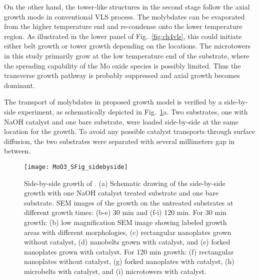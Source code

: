 On the other hand, the tower-like structures in the second stage follow the axial growth mode in conventional VLS process. The molybdates can be evaporated from the higher temperature end and re-condense onto the lower temperature region. As illustrated in the lower panel of Fig.~\ref{fig:ch4vls}, this could initiate either belt growth or tower growth depending on the locations. The microtowers in this study primarily grow at the low temperature end of the substrate, where the spreading capability of the Mo oxide species is possibly limited. Thus the transverse growth pathway is probably suppressed and axial growth becomes dominant.

The transport of molybdates in proposed growth model is verified by a side-by-side experiment, as schematically depicted in Fig.~\ref{fig:ch4sbs}a. Two substrates, one with NaOH catalyst and one bare substrate, were loaded side-by-side at the same location for the growth. To avoid any possible catalyst transports through surface diffusion, the two substrates were separated with several millimeters gap in between. 

\begin{figure}[htb]
\centering
\texttt{[image: MoO3\_SFig\_sidebyside]}
\caption[Side-by-side growth of ]{Side-by-side growth of . (a) Schematic drawing of the side-by-side growth with one NaOH catalyst treated substrate and one bare substrate. SEM images of the growth on the untreated substrates at different growth times: (b-e) 30 min and (f-i) 120 min. For 30 min growth: (b) low magnification SEM image showing labeled growth areas with different morphologies, (c) rectangular nanoplates grown without catalyst, (d) nanobelts grown with catalyst, and (e) forked nanoplates grown with catalyst. For 120 min growth: (f) rectangular nanoplates without catalyst, (g) forked nanoplates with catalyst, (h) microbelts with catalyst, and (i) microtowers with catalyst.}
\label{fig:ch4sbs}
\end{figure}

